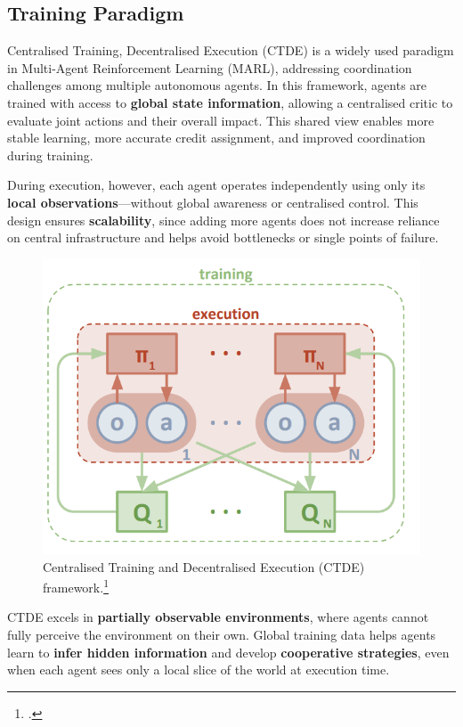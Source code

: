 \subsection{Training Paradigm}

Centralised Training, Decentralised Execution (CTDE) is a widely used paradigm in Multi-Agent Reinforcement Learning (MARL), addressing coordination challenges among multiple autonomous agents. In this framework, agents are trained with access to \textbf{global state information}, allowing a centralised critic to evaluate joint actions and their overall impact. This shared view enables more stable learning, more accurate credit assignment, and improved coordination during training.

During execution, however, each agent operates independently using only its \textbf{local observations}—without global awareness or centralised control. This design ensures \textbf{scalability}, since adding more agents does not increase reliance on central infrastructure and helps avoid bottlenecks or single points of failure.

\begin{figure}[H]
    \centering
    \includegraphics[width=0.7\linewidth]{Figures/CTDE.png}
    \caption{Centralised Training and Decentralised Execution (CTDE) framework.\footcite{lowe2017multiagent}}
    \label{fig:ctde-diagram}
\end{figure}

CTDE excels in \textbf{partially observable environments}, where agents cannot fully perceive the environment on their own. Global training data helps agents learn to \textbf{infer hidden information} and develop \textbf{cooperative strategies}, even when each agent sees only a local slice of the world at execution time.


